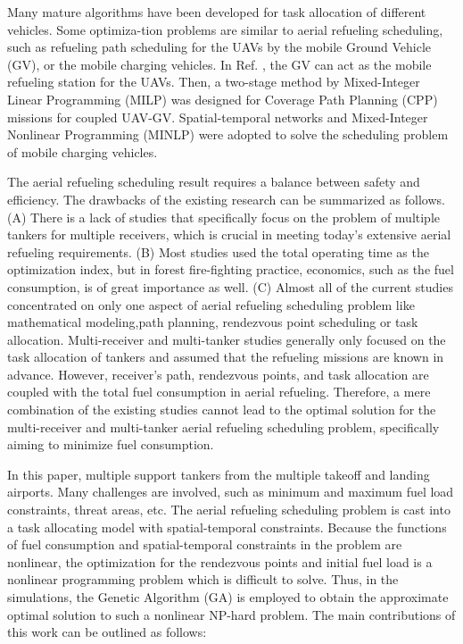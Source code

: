 Many mature algorithms have been developed for task allocation of different vehicles.\cite{kim2018traveling,carter2006new} Some optimiza-tion problems are similar to aerial refueling scheduling, such as refueling path scheduling for the UAVs by the mobile Ground Vehicle (GV), \cite{maini2019cooperative} or the mobile charging vehicles. \cite{1021875904.nh,huang2020planning}In Ref. \cite{maini2019cooperative}, the GV can act as the mobile refueling station for the UAVs. Then, a two-stage method by Mixed-Integer Linear Programming (MILP) was designed for Coverage Path Planning (CPP) missions for coupled UAV-GV. Spatial-temporal networks\cite{1021875904.nh} and Mixed-Integer Nonlinear Programming (MINLP)\cite{huang2020planning} were adopted to solve the scheduling problem of mobile charging vehicles.

The aerial refueling scheduling result requires a balance between safety and efficiency. The drawbacks of the existing research can be summarized as follows. (A) There is a lack of studies that specifically focus on the problem of multiple tankers for multiple receivers, which is crucial in meeting today's extensive aerial refueling requirements. (B) Most studies used the total operating time as the optimization index,\cite{kaplan2012exact} but in forest fire-fighting practice, economics, such as the fuel consumption, is of great importance as well. (C) Almost all of the current studies concentrated on only one aspect of aerial refueling scheduling problem like mathematical modeling,\cite{liu2019optimal}path planning,\cite{hansknecht2023feeder,sundar2013algorithms} rendezvous point scheduling\cite{bordelon1981optimization} or task allocation.\cite{kaplan2012exact,zhu2022aerial} Multi-receiver and multi-tanker studies generally only focused on the task allocation of tankers and assumed that the refueling missions are known in advance. However, receiver's path, rendezvous points, and task allocation are coupled with the total fuel consumption in aerial refueling. Therefore, a mere combination of the existing studies cannot lead to the optimal solution for the multi-receiver and multi-tanker aerial refueling scheduling problem, specifically aiming to minimize fuel consumption.

In this paper, multiple support tankers from the multiple takeoff and landing airports. Many challenges are involved, such as minimum and maximum fuel load constraints, threat areas, etc. The aerial refueling scheduling problem is cast into a task allocating model with spatial-temporal constraints. Because the functions of fuel consumption and spatial-temporal constraints in the problem are nonlinear, the optimization for the rendezvous points and initial fuel load is a nonlinear programming problem which is difficult to solve. Thus, in the simulations, the Genetic Algorithm (GA) is employed to obtain the approximate optimal solution to such a nonlinear NP-hard problem. The main contributions of this work can be outlined as follows:

